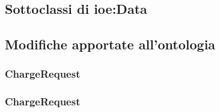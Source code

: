 \subsection{Sottoclassi di ioe:Data}\label{subsec:ioe-data}


\subsection{Modifiche apportate all'ontologia}

\subsubsection{ChargeRequest}\label{subsubsec:chargerequest}

\subsubsection{ChargeRequest}\label{subsubsec:chargeresponse}
